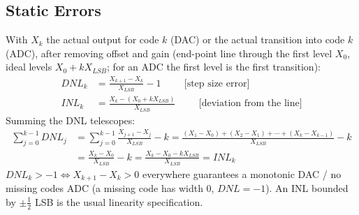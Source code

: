 \subsection{Static Errors}
With \(X_k\) the actual output for code \(k\) (DAC) or the actual transition
into code \(k\) (ADC), after removing offset and gain (end-point line through
the first level \(X_0\), ideal levels \(X_0 + k X_{LSB}\); for an ADC the
first level is the first transition):
\begin{align*}
  DNL_k &= \frac{X_{k+1} - X_k}{X_{LSB}} - 1 \hspace{1cm} \text{[step size error]} \\
  INL_k &= \frac{X_k - (X_0 + k X_{LSB})}{X_{LSB}} \hspace{1cm} \text{[deviation from the line]}
\end{align*}
Summing the DNL telescopes:
\begin{align*}
  \sum_{j=0}^{k-1} DNL_j &= \sum_{j=0}^{k-1} \frac{X_{j+1} - X_j}{X_{LSB}} - k
  = \frac{(X_1 - X_0) + (X_2 - X_1) + \cdots + (X_k - X_{k-1})}{X_{LSB}} - k \\
  &= \frac{X_k - X_0}{X_{LSB}} - k = \frac{X_k - X_0 - k X_{LSB}}{X_{LSB}} = INL_k
\end{align*}
\(DNL_k > -1 \Leftrightarrow X_{k+1} - X_k > 0\) everywhere guarantees a
monotonic DAC / no missing codes ADC (a missing code has width 0, \(DNL = -1\)).
An INL bounded by \(\pm\frac{1}{2}\) LSB is the usual linearity specification.

